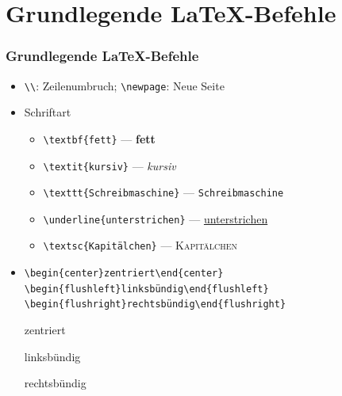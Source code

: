 \section{Grundlegende \LaTeX-Befehle}

\begin{frame}[<+->][fragile]
	\frametitle{Grundlegende \LaTeX-Befehle}
	
	\begin{itemize}
		\item \lstinline!\\!: Zeilenumbruch; \lstinline!\newpage!: Neue Seite
		\item Schriftart
		\begin{itemize}
			\item \lstinline!\textbf{fett}! — {\rmfamily\textbf{fett}}
			\item \lstinline!\textit{kursiv}! — {\rmfamily\textit{kursiv}}
			\item \lstinline!\texttt{Schreibmaschine}! — {\rmfamily\texttt{Schreibmaschine}}
			\item \lstinline!\underline{unterstrichen}! — {\rmfamily\underline{unterstrichen}}
			\item \lstinline!\textsc{Kapitälchen}! — {\rmfamily\textsc{Kapitälchen}}
		\end{itemize}
		\item \lstinline!\begin{center}zentriert\end{center} \begin{flushleft}linksbündig\end{flushleft} \begin{flushright}rechtsbündig\end{flushright}!
		
		{\justifying\rmfamily
		\begin{center}zentriert\end{center}
		\begin{flushleft}linksbündig\end{flushleft}
		\begin{flushright}rechtsbündig\end{flushright}}
	\end{itemize}
\end{frame}

